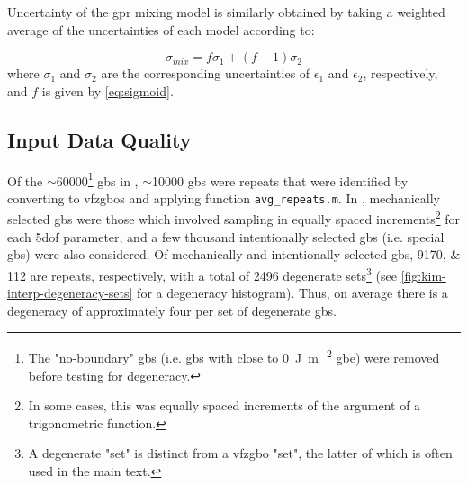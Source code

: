 \documentclass[preprint,12pt]{elsarticle}
\begin{document}
Uncertainty of the \gls{gpr} mixing model is similarly obtained by taking a weighted average of the uncertainties of each model according to:

\begin{equation}
    \sigma_{mix} = f \sigma_1+(f-1) \sigma_2
    \label{eq:gprmix-sigma}
\end{equation}
where $\sigma_1$ and $\sigma_2$ are the corresponding uncertainties of $\epsilon_1$ and $\epsilon_2$, respectively, and $f$ is given by \cref{eq:sigmoid}. 

\subsection{Input Data Quality}
\label{sec:supp:kim-interp:quality}
Of the $\sim$\num{60000}\footnote{The "no-boundary" \glspl{gb} (i.e. \glspl{gb} with close to \SI{0}{\joule\per\square\meter} \gls{gbe}) were removed before testing for degeneracy.} \glspl{gb} in \cite{kimPhasefieldModeling3D2014}, $\sim$\num{10000} \glspl{gb} were repeats that were identified by converting to \glspl{vfzgbo} and applying \vfzorepo{} function \texttt{avg\_repeats.m}. In \cite{kimPhasefieldModeling3D2014}, mechanically selected \glspl{gb} were those which involved sampling in equally spaced increments\footnote{In some cases, this was equally spaced increments of the argument of a trigonometric function.} for each \gls{5dof} parameter, and a few thousand intentionally selected \glspl{gb} (i.e. special \glspl{gb}) were also considered. Of mechanically and intentionally selected \glspl{gb}, \numlist{9170;112} are repeats, respectively, with a total of \num{2496} degenerate sets\footnote{A degenerate "set" is distinct from a \gls{vfzgbo} "set", the latter of which is often used in the main text.} (see \cref{fig:kim-interp-degeneracy-sets} for a degeneracy histogram). Thus, on average there is a degeneracy of approximately four per set of degenerate \glspl{gb}.
\end{document}
